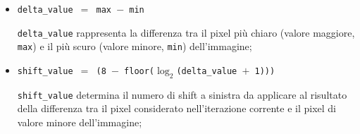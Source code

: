 \documentclass{article}
\begin{document}
\begin{itemize}
    \item   \texttt{delta\_value $=$ max $-$ min}\par
            \texttt{delta\_value} rappresenta la differenza tra il pixel più chiaro (valore maggiore, \texttt{max}) e il più scuro (valore minore, \texttt{min}) dell’immagine;
            
            \pagebreak
    
    \item   \texttt{shift\_value $=$ (8 $-$ floor\footnotemark($\log_{2} $(delta\_value $+$ 1)))}\par
            \texttt{shift\_value} determina il numero di shift a sinistra da applicare al risultato della differenza tra il pixel considerato nell’iterazione corrente e il pixel di valore minore dell’immagine;


\end{itemize}
\end{document}
